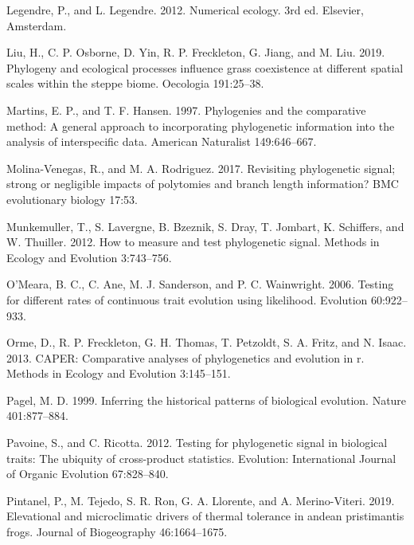 \documentclass[
]{article}
\begin{document}
\leavevmode\hypertarget{ref-LegendreLegendre2012}{}%
Legendre, P., and L. Legendre. 2012. Numerical ecology. 3rd ed.
Elsevier, Amsterdam.

\leavevmode\hypertarget{ref-Liu2019}{}%
Liu, H., C. P. Osborne, D. Yin, R. P. Freckleton, G. Jiang, and M. Liu.
2019. Phylogeny and ecological processes influence grass coexistence at
different spatial scales within the steppe biome. Oecologia 191:25--38.

\leavevmode\hypertarget{ref-MartinsHansen1997}{}%
Martins, E. P., and T. F. Hansen. 1997. Phylogenies and the comparative
method: A general approach to incorporating phylogenetic information
into the analysis of interspecific data. American Naturalist
149:646--667.

\leavevmode\hypertarget{ref-MolinaVenegas2017}{}%
Molina-Venegas, R., and M. A. Rodriguez. 2017. Revisiting phylogenetic
signal; strong or negligible impacts of polytomies and branch length
information? BMC evolutionary biology 17:53.

\leavevmode\hypertarget{ref-Munkemuller_et_al2012}{}%
Munkemuller, T., S. Lavergne, B. Bzeznik, S. Dray, T. Jombart, K.
Schiffers, and W. Thuiller. 2012. How to measure and test phylogenetic
signal. Methods in Ecology and Evolution 3:743--756.

\leavevmode\hypertarget{ref-OMeara_et_al2006}{}%
O'Meara, B. C., C. Ane, M. J. Sanderson, and P. C. Wainwright. 2006.
Testing for different rates of continuous trait evolution using
likelihood. Evolution 60:922--933.

\leavevmode\hypertarget{ref-Orme2013}{}%
Orme, D., R. P. Freckleton, G. H. Thomas, T. Petzoldt, S. A. Fritz, and
N. Isaac. 2013. CAPER: Comparative analyses of phylogenetics and
evolution in r. Methods in Ecology and Evolution 3:145--151.

\leavevmode\hypertarget{ref-Pagel1999}{}%
Pagel, M. D. 1999. Inferring the historical patterns of biological
evolution. Nature 401:877--884.

\leavevmode\hypertarget{ref-Pavoine2012}{}%
Pavoine, S., and C. Ricotta. 2012. Testing for phylogenetic signal in
biological traits: The ubiquity of cross-product statistics. Evolution:
International Journal of Organic Evolution 67:828--840.

\leavevmode\hypertarget{ref-Pintanel2019}{}%
Pintanel, P., M. Tejedo, S. R. Ron, G. A. Llorente, and A.
Merino-Viteri. 2019. Elevational and microclimatic drivers of thermal
tolerance in andean pristimantis frogs. Journal of Biogeography
46:1664--1675.
\end{document}
